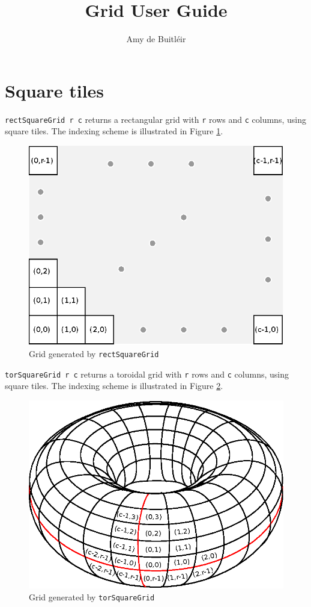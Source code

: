 \documentclass[a4paper,10pt]{article}
\title{Grid User Guide}
\author{Amy de Buitléir}
\begin{document}
\maketitle

\section{Square tiles}

\texttt{rectSquareGrid r c} returns a rectangular grid with \texttt{r} rows and \texttt{c} columns, using square tiles.
The indexing scheme is illustrated in Figure \ref{fig:rectSquareGrid}.

\begin{figure}[ht]
 \label{fig:rectSquareGrid}
 \centering
 \includegraphics{./images/rectSquareGrid.eps}
 \caption{Grid generated by \texttt{rectSquareGrid}}
\end{figure}


\texttt{torSquareGrid r c} returns a toroidal grid with \texttt{r} rows and \texttt{c} columns, using square tiles.
The indexing scheme is illustrated in Figure \ref{fig:torSquareGrid}.

\begin{figure}[ht]
 \label{fig:torSquareGrid}
 \centering
 \includegraphics{./images/torSquareGrid.eps}
 \caption{Grid generated by \texttt{torSquareGrid}}
\end{figure}
\end{document}
